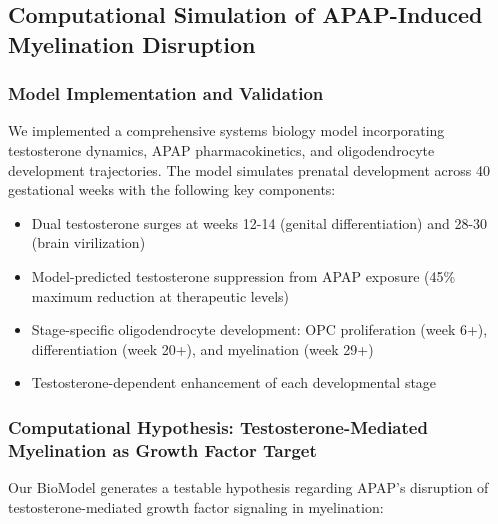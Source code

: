 \documentclass[11pt]{article}
\let\oldsubsection\subsection
\renewcommand{\subsection}[1]{\oldsubsection{#1}\setlength{\leftskip}{0.75em}}
\let\oldsubsubsection\subsubsection
\renewcommand{\subsubsection}[1]{\oldsubsubsection{#1}\setlength{\leftskip}{1.5em}}
\begin{document}
\subsection{Computational Simulation of APAP-Induced Myelination Disruption}

\subsubsection{Model Implementation and Validation}

We implemented a comprehensive systems biology model incorporating testosterone dynamics, APAP pharmacokinetics, and oligodendrocyte development trajectories. The model simulates prenatal development across 40 gestational weeks with the following key components:

\begin{itemize}
\item Dual testosterone surges at weeks 12-14 (genital differentiation) and 28-30 (brain virilization)
\item Model-predicted testosterone suppression from APAP exposure (45\% maximum reduction at therapeutic levels)
\item Stage-specific oligodendrocyte development: OPC proliferation (week 6+), differentiation (week 20+), and myelination (week 29+)
\item Testosterone-dependent enhancement of each developmental stage
\end{itemize}

\subsubsection{Computational Hypothesis: Testosterone-Mediated Myelination as Growth Factor Target}

Our BioModel generates a testable hypothesis regarding APAP's disruption of testosterone-mediated growth factor signaling in myelination:
\end{document}
